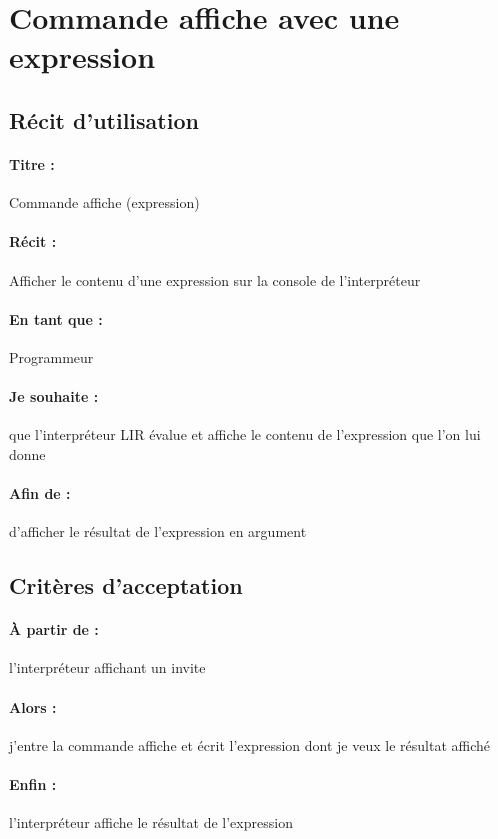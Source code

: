     \section{Commande affiche avec une expression}

	\subsection*{Récit d'utilisation}

	\paragraph{Titre : } Commande affiche (expression)
	\paragraph{Récit : }  Afficher le contenu d'une expression sur la console de l'interpréteur
	\paragraph{En tant que : } Programmeur
	\paragraph{Je souhaite : } que l'interpréteur LIR évalue et affiche le contenu de l'expression que l'on lui donne
	\paragraph{Afin de : } d'afficher le résultat de l'expression en argument

	\subsection*{Critères d'acceptation}

	\paragraph{À partir de : } l'interpréteur affichant un invite
	\paragraph{Alors : } j'entre la commande affiche et écrit l'expression dont je veux le résultat affiché
	\paragraph{Enfin : } l'interpréteur affiche le résultat de l'expression
